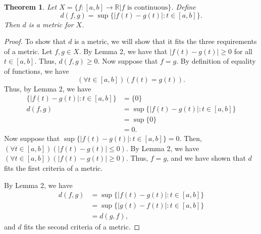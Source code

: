 \documentclass[12pt,a4paper]{article}
\theoremstyle{theorem}
\newtheorem{theorem}{Theorem}
\theoremstyle{definition}
\begin{document}
\begin{theorem}
Let $X = \{f:[a, b] \to \mathbb{R} | f \text{ is continuous}\}$.  Define
\begin{equation*}
d(f,  g) = \sup \{|f(t) - g(t)| : t \in [a, b] \}.
\end{equation*}
Then $d$ is a metric for $X$.
\end{theorem}

\begin{proof}
To show that $d$ is a metric,  we will show that it fits the three requirements of a metric.  Let $f,  g \in X$.  By Lemma 2,  we have that $|f(t) - g(t)| \geq 0$ for all $t \in [a,  b]$.  Thus,  $d(f,  g) \geq 0$.  Now suppose that $f = g$.  By definition of equality of functions,  we have 
\begin{equation*}
(\forall t \in [a,  b])(f(t) = g(t)).
\end{equation*}
Thus,  by Lemma 2,  we have 
\begin{align*}
\{|f(t) - g(t)| : t \in [a, b] \} &= \{0 \}\\
d(f,  g) &= \sup \{|f(t) - g(t)| : t \in [a, b] \}\\
&= \sup \{0 \} \\
&= 0.
\end{align*}
Now suppose that $\sup \{|f(t) - g(t)| : t \in [a, b] \} = 0$.  Then,  $(\forall t \in [a,  b])(|f(t) - g(t)| \leq 0)$.  By Lemma 2,  we have $(\forall t \in [a,  b])(|f(t) - g(t)| \geq 0)$.  Thus,  $f = g$, and we have shown that $d$ fits the first criteria of a metric.

By Lemma 2,  we have 
\begin{align*}
d(f,  g) &= \sup \{|f(t) - g(t)| : t \in [a, b] \}\\
&= \sup \{|g(t) - f(t)| : t \in [a, b] \}\\
&= d(g,  f) \text{,}
\end{align*}
and $d$ fits the second criteria of a metric.
\end{proof}
\end{document}
